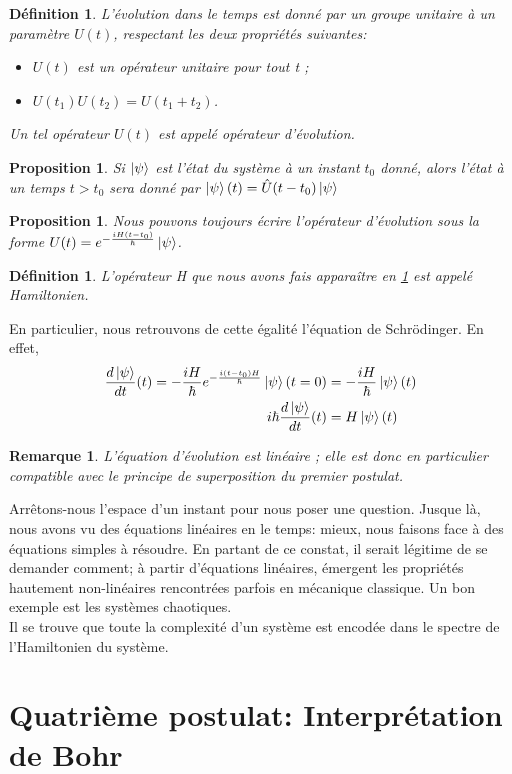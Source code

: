 \documentclass{report}
\numberwithin{equation}{part}
\newtheorem{definition}[theorem]{Définition}
\newtheorem{Property}[theorem]{Proposition}
\newtheorem{remark}[theorem]{Remarque}
\begin{document}
\begin{definition}
    L'évolution dans le temps est donné par un groupe unitaire à un paramètre $U(t)$, respectant les deux propriétés suivantes:
    \begin{itemize}
        \item $U(t)$ est un opérateur unitaire pour tout t ;
        \item $U(t_1)U(t_2)=U(t_1+t_2)$.
    \end{itemize}
    Un tel opérateur $U(t)$ est appelé \emph{opérateur d'évolution}.
\end{definition}

\begin{Property}
    Si $\ket{\psi}$ est l'état du système à un instant $t_0$ donné, alors l'état à un temps $t>t_0$ sera donné par 
    \begin{math}
        \ket{\psi}(t) = \hat{U}(t-t_0)\ket{\psi}
    \end{math}
\end{Property}

\begin{Property}
    \label{Operateur d'evolution}
    Nous pouvons toujours écrire l'opérateur d'évolution sous la forme $U(t) = e^{-\frac{iH(t-t_0)}{\hbar}}\ket{\psi}$. 
\end{Property}

\begin{definition}
    L'opérateur H que nous avons fais apparaître en \ref{Operateur d'evolution} est appelé Hamiltonien. 
\end{definition}

En particulier, nous retrouvons de cette égalité l'équation de Schrödinger. En effet,
\begin{align}
    \frac{d\ket{\psi}}{dt} (t)= -\frac{iH}{\hbar}e^{-\frac{i(t-t_0)H}{\hbar}}\ket{\psi}(t=0) &= -\frac{iH}{\hbar}\ket{\psi}(t)\\
    i\hbar\frac{d\ket{\psi}}{dt} (t) &= H\ket{\psi}(t) \label{Schrodinger}
\end{align}

\begin{remark}
    L'équation d'évolution est linéaire ; elle est donc en particulier compatible avec le principe de superposition du premier postulat.
\end{remark}

Arrêtons-nous l'espace d'un instant pour nous poser une question. Jusque là, nous avons vu des équations linéaires en le temps: mieux, nous faisons face à des équations simples à résoudre. En partant de ce constat, il serait légitime de se demander comment; à partir d'équations linéaires, émergent les propriétés hautement non-linéaires rencontrées parfois en mécanique classique. Un bon exemple est les systèmes chaotiques.\\

Il se trouve que toute la complexité d'un système est encodée dans le spectre de l'Hamiltonien du système.

\section{Quatrième postulat: Interprétation de Bohr}
\end{document}
